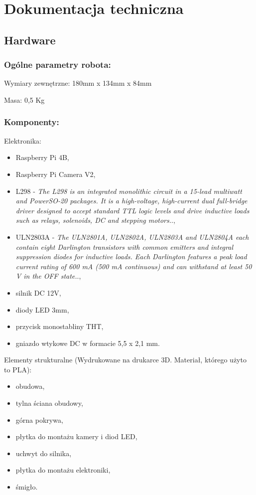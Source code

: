 \section{Dokumentacja techniczna}
\subsection{Hardware}
\subsubsection{Ogólne parametry robota:}
Wymiary zewnętrzne: 180mm x  134mm x 84mm

Masa: 0,5 Kg

\subsubsection{Komponenty:}
Elektronika:
    \begin{itemize}
        \item Raspberry Pi 4B,
        \item Raspberry Pi Camera V2,
        \item L298 - \textit{The L298 is an integrated monolithic circuit in a 15-lead multiwatt and PowerSO-20
        packages. It is a high-voltage, high-current dual full-bridge driver designed to accept
        standard TTL logic levels and drive inductive loads such as relays, solenoids, DC
        and stepping motors.}.\cite{L298},
        \item ULN2803A - \textit{The ULN2801A, ULN2802A, ULN2803A and
        ULN2804A each contain eight Darlington
        transistors with common emitters and integral
        suppression diodes for inductive loads. Each
        Darlington features a peak load current rating of
        600 mA (500 mA continuous) and can withstand
        at least 50 V in the OFF state.}.\cite{ULN2803a},
        \item silnik DC 12V,
        \item diody LED 3mm,
        \item przycisk monostabliny THT,
        \item gniazdo wtykowe DC w formacie 5,5 x 2,1 mm.
    \end{itemize}

Elementy strukturalne (Wydrukowane na drukarce 3D. Materiał, którego użyto to PLA):
    \begin{itemize}
        \item obudowa,
        \item tylna ściana obudowy,
        \item górna pokrywa,
        \item płytka do montażu kamery i diod LED,
        \item uchwyt do silnika,
        \item płytka do montażu elektroniki,
        \item śmigło.
    \end{itemize}\

